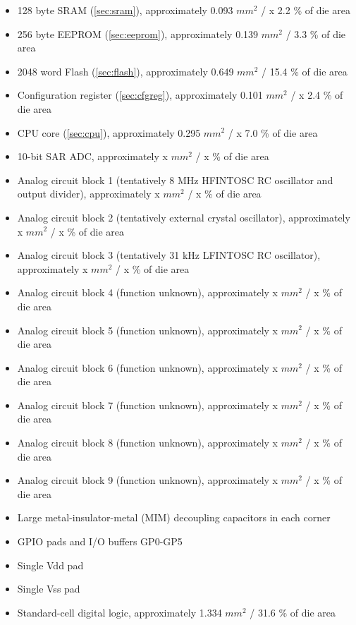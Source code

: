 \documentclass[letterpaper]{article}
\begin{document}
\begin{itemize}
\item 128 byte SRAM (\autoref{sec:sram}), approximately 0.093 $mm^2$ / x 2.2 \% of die area
\item 256 byte EEPROM (\autoref{sec:eeprom}), approximately 0.139 $mm^2$ / 3.3 \% of die area
\item 2048 word Flash (\autoref{sec:flash}), approximately 0.649 $mm^2$ / 15.4 \% of die area
\item Configuration register (\autoref{sec:cfgreg}), approximately 0.101 $mm^2$ / x 2.4 \% of die area
\item CPU core (\autoref{sec:cpu}), approximately 0.295 $mm^2$ / x 7.0 \% of die area
\item 10-bit SAR ADC, approximately x $mm^2$ / x \% of die area
\item Analog circuit block 1 (tentatively 8 MHz HFINTOSC RC oscillator and output divider), approximately x $mm^2$ / x \% of die area
\item Analog circuit block 2 (tentatively external crystal oscillator), approximately x $mm^2$ / x \% of die area
\item Analog circuit block 3 (tentatively 31 kHz LFINTOSC RC oscillator), approximately x $mm^2$ / x \% of die area
\item Analog circuit block 4 (function unknown), approximately x $mm^2$ / x \% of die area
\item Analog circuit block 5 (function unknown), approximately x $mm^2$ / x \% of die area
\item Analog circuit block 6 (function unknown), approximately x $mm^2$ / x \% of die area
\item Analog circuit block 7 (function unknown), approximately x $mm^2$ / x \% of die area
\item Analog circuit block 8 (function unknown), approximately x $mm^2$ / x \% of die area
\item Analog circuit block 9 (function unknown), approximately x $mm^2$ / x \% of die area
\item Large metal-insulator-metal (MIM) decoupling capacitors in each corner
\item GPIO pads and I/O buffers GP0-GP5
\item Single Vdd pad
\item Single Vss pad
\item Standard-cell digital logic, approximately 1.334 $mm^2$ / 31.6 \% of die area
\end{itemize}
\end{document}
